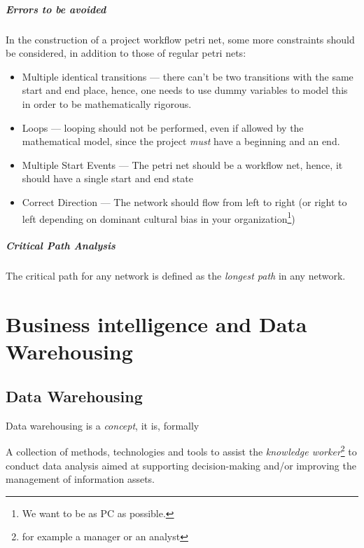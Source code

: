 \documentclass[openright, twoside, twocolumn, a4paper, 10pt]{report}
\begin{document}
\paragraph{Errors to be avoided}

In the construction of a project workflow petri net, some more constraints should be considered,
in addition to those of regular petri nets:

\begin{itemize}
	\item Multiple identical transitions --- there can't be two transitions with the same start and end place, hence,
	      one needs to use dummy variables to model this in order to be mathematically rigorous.
	\item Loops --- looping should not be performed, even if allowed by the mathematical model, since the project \emph{must}
	      have a beginning and an end.
	\item Multiple Start Events --- The petri net should be a workflow net, hence, it should have a single start and end state
	\item Correct Direction --- The network should flow from left to right (or right to left depending on dominant cultural bias
	      in your organization\footnote{We want to be as PC as possible.})
\end{itemize}

\paragraph{Critical Path Analysis}
The critical path for any network is defined as the \emph{longest path} in any network.


\chapter{Business intelligence and Data Warehousing}

\section{Data Warehousing}

Data warehousing is a \emph{concept}, it is, formally

\begin{definition}
	A collection of methods, technologies and tools to
	assist the \emph{knowledge worker}\footnote{
		for example a manager or an analyst
	} to conduct data analysis aimed at supporting
	decision-making and/or improving the management of
	information assets.
\end{definition}
\end{document}

